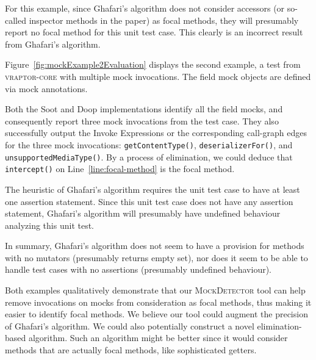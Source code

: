 For this example, since Ghafari's algorithm does not consider accessors (or so-called inspector methods in the paper) as focal methods, they will presumably report no focal method for this unit test case. This clearly is an incorrect result from Ghafari's algorithm.

Figure~\ref{fig:mockExample2Evaluation} displays the second example, a test from \textsc{vraptor-core} with multiple mock invocations. The field mock objects are defined via mock annotations. 

Both the Soot and Doop implementations identify all the field mocks, and consequently report three mock invocations from the test case. They also successfully output the Invoke Expressions or the corresponding call-graph edges for the three mock invocations: \texttt{getContentType()}, \texttt{deserializerFor()}, and \texttt{unsupportedMediaType()}. By a process of elimination, we could deduce that \texttt{intercept()} on Line~\ref{line:focal-method} is the focal method. 

The heuristic of Ghafari's algorithm requires the unit test case to have at least one assertion statement. Since this unit test case does not have any assertion statement, Ghafari's algorithm will presumably have undefined behaviour analyzing this unit test.

In summary, Ghafari's algorithm does not seem to have a provision for methods with no mutators (presumably returns empty set), nor does it seem to be able to handle test cases with no assertions (presumably undefined behaviour).

Both examples qualitatively demonstrate that our \textsc{MockDetector} tool can help remove invocations on mocks from consideration as focal methods, thus making it easier to identify focal methods. We believe our tool could augment the precision of Ghafari's algorithm. We could also potentially construct a novel elimination-based algorithm. Such an algorithm might be better since it would consider methods that are actually focal methods, like sophisticated getters.


